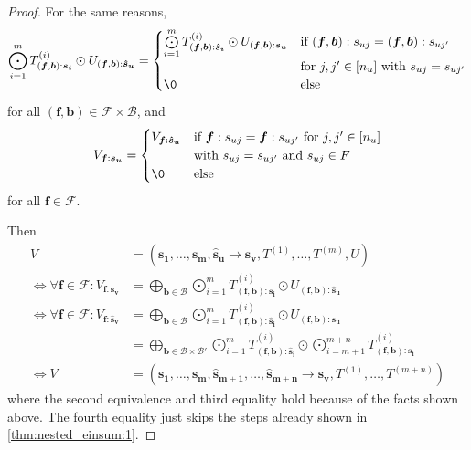 \begin{proof}
    For the same reasons,
    $$\bigodot\limits_{i = 1}^{m} T^{(i)}_{(\bm{f}, \bm{b}): \bm{s_i}} \odot U_{(\bm{f}, \bm{b}): \bm{\hat{s}_u}} = \begin{cases}
            \bigodot\limits_{i = 1}^{m} T^{(i)}_{(\bm{f}, \bm{b}): \bm{\hat{s}_i}} \odot U_{(\bm{f}, \bm{b}): \bm{s_u}} & \text{if } (\bm{f}, \bm{b}):s_{uj} = (\bm{f}, \bm{b}):s_{uj'} \\
                                                                                                                        & \text{for } j,j' \in [n_u] \text{ with } s_{uj} = s_{uj'}     \\
            \0                                                                                                          & \text{else}
        \end{cases}$$
    for all $(\bm{f}, \bm{b}) \in \mathcal{F} \times \mathcal{B}$, and
    $$V_{\bm{f}: \bm{s_u}} = \begin{cases}
            V_{\bm{f}: \bm{\hat{s}_u}} & \text{if } \bm{f}:s_{uj} = \bm{f}:s_{uj'} \text{ for } j,j' \in [n_u] \\
                                       & \text{with } s_{uj} = s_{uj'} \text{ and } s_{uj} \in F               \\
            \0                         & \text{else}
        \end{cases}$$
    for all $\bm{f} \in \mathcal{F}$.

    Then
    \begin{align*}
        V                                                               & = (\bm{s_1},\dots,\bm{s_m}, \bm{\hat{s}_u} \rightarrow \bm{s_v}, T^{(1)},\dots,T^{(m)}, U)                                                                                                                          \\
        \iff \forall \bm{f} \in \mathcal{F}: V_{\bm{f}: \bm{s_v}}       & = \bigoplus\limits_{\bm{b} \in \mathcal{B}} \bigodot\limits_{i = 1}^{m} T^{(i)}_{(\bm{f}, \bm{b}):\bm{s_i}} \odot U_{(\bm{f}, \bm{b}):\bm{\hat{s}_u}}                                                               \\
        \iff \forall \bm{f} \in \mathcal{F}: V_{\bm{f}: \bm{\hat{s}_v}} & = \bigoplus\limits_{\bm{b} \in \mathcal{B}} \bigodot\limits_{i = 1}^{m} T^{(i)}_{(\bm{f}, \bm{b}):\bm{\hat{s}_i}} \odot U_{(\bm{f}, \bm{b}):\bm{s_u}}                                                               \\
                                                                        & = \bigoplus\limits_{\bm{b} \in \mathcal{B} \times \mathcal{B}'} \bigodot\limits_{i = 1}^{m} T^{(i)}_{(\bm{f}, \bm{b}):\bm{\hat{s}_i}} \odot \bigodot\limits_{i = m + 1}^{m + n} T^{(i)}_{(\bm{f}, \bm{b}):\bm{s_i}} \\
        \iff V                                                          & = (\bm{s_1}, \dots, \bm{s_m}, \bm{\hat{s}_{m + 1}}, \dots, \bm{\hat{s}_{m + n}} \rightarrow \bm{s_v}, T^{(1)}, \dots, T^{(m + n)})
    \end{align*}
    where the second equivalence and third equality hold because of the facts shown above.
    The fourth equality just skips the steps already shown in \autoref{thm:nested_einsum:1}.
\end{proof}
\bigskip